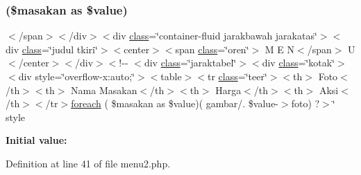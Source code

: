 \subsubsection{\texorpdfstring{(\$masakan as \$value)}{($masakan as $value)}}
{\footnotesize\ttfamily $<$/span$>$$<$/div$>$$<$div \mbox{\hyperlink{waiter_2olaporan_8php_a185c73c6507391d1eb38c776b68ce96d}{class}}=\char`\"{}container-\/fluid jarakbawah jarakatas\char`\"{}$>$$<$div \mbox{\hyperlink{waiter_2olaporan_8php_a185c73c6507391d1eb38c776b68ce96d}{class}}=\char`\"{}judul tkiri\char`\"{}$>$$<$center$>$$<$span \mbox{\hyperlink{waiter_2olaporan_8php_a185c73c6507391d1eb38c776b68ce96d}{class}}=\char`\"{}oren\char`\"{}$>$ M E N$<$/span$>$ U$<$/center$>$$<$/div$>$$<$!-\/-\/ $<$div \mbox{\hyperlink{waiter_2olaporan_8php_a185c73c6507391d1eb38c776b68ce96d}{class}}=\char`\"{}jaraktabel\char`\"{}$>$$<$div \mbox{\hyperlink{waiter_2olaporan_8php_a185c73c6507391d1eb38c776b68ce96d}{class}}=\char`\"{}kotak\char`\"{}$>$$<$div style=\char`\"{}overflow-\/x\+:auto;\char`\"{}$>$$<$table$>$$<$tr \mbox{\hyperlink{waiter_2olaporan_8php_a185c73c6507391d1eb38c776b68ce96d}{class}}=\char`\"{}teer\char`\"{}$>$$<$th$>$ Foto$<$/th$>$$<$th$>$ Nama Masakan$<$/th$>$$<$th$>$ Harga$<$/th$>$$<$th$>$ Aksi$<$/th$>$$<$/tr$>$\mbox{\hyperlink{pdetailorder_8php_a2e23c42e9b59be6e2bbc1bac76422d34}{foreach}} ( \$masakan as \$value)( \textquotesingle{}gambar/\textquotesingle{}. \$value-\/$>$foto) ?$>$\char`\"{} style}

{\bfseries Initial value\+:}
\begin{DoxyCode}{0}

\end{DoxyCode}


Definition at line 41 of file menu2.\+php.

